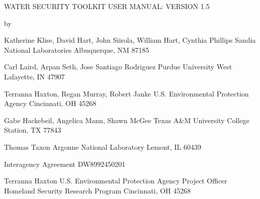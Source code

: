 \begin{center}

WATER SECURITY TOOLKIT USER MANUAL:
VERSION 1.5

by 


Katherine Klise, David Hart, John Siirola, William Hart, Cynthia Phillips 
Sandia National Laboratories
Albuquerque, NM 87185


Carl Laird, Arpan Seth, Jose Santiago Rodriguez
Purdue University
West Lafayette, IN 47907


Terranna Haxton, Regan Murray, Robert Janke
U.S. Environmental Protection Agency
Cincinnati, OH 45268


Gabe Hackebeil, Angelica Mann, Shawn McGee
Texas A\&M University
College Station, TX 77843


Thomas Taxon
Argonne National Laboratory
Lemont, IL 60439





Interagency Agreement DW8992450201 






Terranna Haxton
U.S. Environmental Protection Agency Project Officer 
Homeland Security Research Program 
Cincinnati, OH 45268

\end{center}
